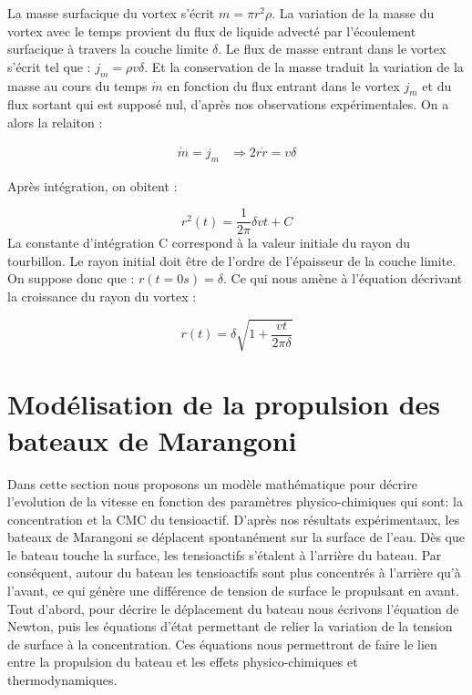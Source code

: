 \documentclass[french, 10pt]{article}
\begin{document}
La masse surfacique du vortex s'écrit $m=\pi r^2 \rho$. La variation de la masse du vortex avec le temps provient du flux de liquide advecté par l'écoulement surfacique à travers la couche limite $\delta$.  Le flux de masse entrant dans le vortex s'écrit tel que : $j_m=\rho v\delta$. Et la conservation de la masse traduit la variation de la masse au cours du temps $\dot{m}$ en fonction du flux entrant dans le vortex $j_m$ et du flux sortant qui est supposé nul, d'après nos observations expérimentales. On a alors la relaiton : 

\begin{equation}
  \begin{array}{cc}
    \dot{m} = j_m & \Rightarrow 2r\dot{r}=v\delta
  \end{array}
\end{equation}

Après intégration, on obitent : 

\begin{equation}
  r^2(t)=\dfrac{1}{2\pi}\delta vt+C
\end{equation}
La constante d'intégration C correspond à la valeur initiale du rayon du tourbillon. Le rayon initial doit être de l'ordre de l'épaisseur de la couche limite. On suppose donc que : $r(t = 0 s) = \delta$. Ce qui nous
amène à l'équation décrivant la croissance du rayon du vortex : 

\begin{equation}
  r(t)
=\delta\sqrt{1+\dfrac{vt}{2\pi\delta}}\end{equation}

\section{Modélisation de la propulsion des bateaux de Marangoni}

Dans cette section nous proposons un modèle mathématique pour décrire l'evolution de la vitesse en fonction des paramètres physico-chimiques qui sont: la concentration et la CMC du tensioactif. D'après nos résultats expérimentaux, les bateaux de Marangoni se déplacent spontanément sur la surface de l'eau. Dès que le bateau touche la surface, les tensioactifs s'étalent à l'arrière du bateau. Par conséquent, autour du bateau les tensioactifs sont plus concentrés à l'arrière qu'à l'avant, ce qui génère une différence de tension de surface le propulsant en avant. Tout d'abord, pour décrire le déplacement du bateau nous écrivons l'équation de Newton, puis les équations d'état permettant de relier la variation de la tension de surface à la concentration. Ces équations nous permettront de faire le lien entre la propulsion du bateau et les effets physico-chimiques et thermodynamiques.
\end{document}
